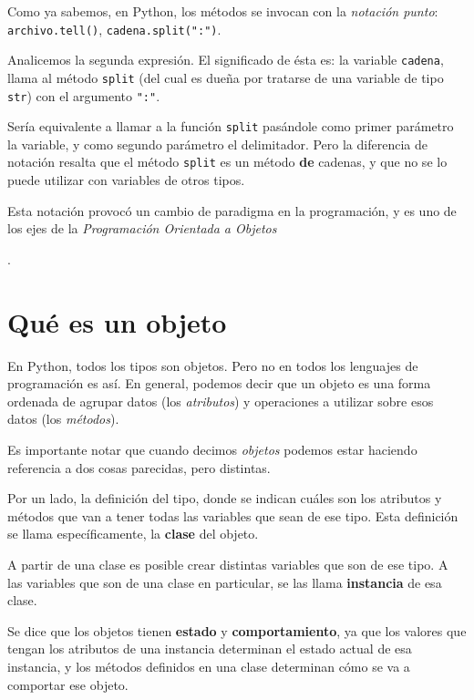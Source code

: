 \begin{observacion}
Como ya sabemos, en Python, los métodos se invocan con la {\it notación punto}:
\lstinline+archivo.tell()+, \lstinline+cadena.split(":")+.

Analicemos la segunda expresión.  El significado de ésta es: la variable
\lstinline!cadena!, llama al método \lstinline+split+ (del cual es dueña
por tratarse de una variable de tipo \lstinline!str!) con el argumento
\lstinline+":"+.

Sería equivalente a llamar a la función \lstinline!split! pasándole como
primer parámetro la variable, y como segundo parámetro el delimitador.
Pero la diferencia de notación resalta que el método \lstinline!split! es
un método {\bf de} cadenas, y que no se lo puede utilizar con variables de
otros tipos.

Esta notación provocó un cambio de paradigma en la programación, y es uno de
los ejes de la {\it Programación Orientada a Objetos}
\end{observacion}.

\section{Qué es un objeto}

En Python, todos los tipos son objetos.  Pero no en todos los lenguajes de
programación es así.  En general, podemos decir que un objeto es una forma
ordenada de agrupar datos (los {\it atributos}) y operaciones a utilizar
sobre esos datos (los {\it métodos}).

Es importante notar que cuando decimos {\it objetos} podemos estar haciendo
referencia a dos cosas parecidas, pero distintas.

Por un lado, la definición del tipo, donde se indican cuáles son los
atributos y métodos que van a tener todas las variables que sean de ese
tipo.  Esta definición se llama específicamente, la {\bf clase} del objeto.

A partir de una clase es posible crear distintas variables que son de ese
tipo. A las variables que son de una clase en particular, se las llama
{\bf instancia} de esa clase.

\begin{observacion}
Se dice que los objetos tienen {\bf estado} y {\bf comportamiento}, ya que
los valores que tengan los atributos de una instancia determinan el estado
actual de esa instancia, y los métodos definidos en una clase determinan
cómo se va a comportar ese objeto.
\end{observacion}

